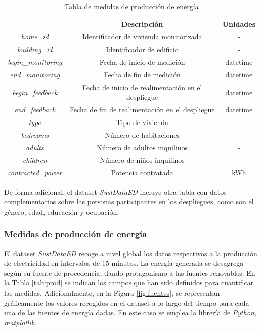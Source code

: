\vspace{3mm}

\begin{table}[h!]
    \centering
    \begin{tabular}{|c|c|c|}
    \hline
    \rowcolor[HTML]{AAAAAA} 
    \multicolumn{1}{|c|}{\cellcolor[HTML]{AAAAAA}Campo} & \multicolumn{1}{c|}{\cellcolor[HTML]{AAAAAA}Descripción} & Unidades \\ \hline
    \textit{home\_id} & Identificador de vivienda monitorizada & - \\ \hline
    \textit{building\_id} & Identificador de edificio & - \\ \hline
    \textit{begin\_monitoring} & Fecha de inicio de medición & datetime \\ \hline
    \textit{end\_monitoring} & Fecha de fin de medición & datetime \\ \hline
    \textit{begin\_feedback} & Fecha de inicio de realimentación en el despliegue & datetime \\ \hline
    \textit{end\_feedback} & Fecha de fin de realimentación en el despliegue & datetime \\ \hline
    \textit{type} & Tipo de vivienda & - \\ \hline
    \textit{bedrooms} & Número de habitaciones & - \\ \hline
    \textit{adults} & Número de adultos inquilinos & - \\ \hline
    \textit{children} & Número de niños inquilinos & - \\ \hline
    \textit{contracted\_power} & Potencia contratada & kWh \\ \hline
    \end{tabular}
    \caption{Tabla de medidas de producción de energía \cite{sustdata}}
    \label{tab:demo}
\end{table}

De forma adicional, el dataset \textit{SustDataED} incluye otra tabla con datos complementarios sobre las personas participantes en los despliegues, como son el género, edad, educación y ocupación.

\subsubsection{Medidas de producción de energía}
\label{sec:prodsustdata}

El dataset \textit{SustDataED} recoge a nivel global los datos respectivos a la producción de electricidad en intervalos de 15 minutos. La energía generada se desagrega según su fuente de procedencia, dando protagonismo a las fuentes renovables. En la Tabla \ref{tab:prod} se indican los campos que han sido definidos para cuantificar las medidas. Adicionalmente, en la Figura \ref{fig:fuentes}, se representan gráficamente los valores recogidos en el dataset a lo largo del tiempo para cada una de las fuentes de energía dadas. En este caso se emplea la librería de \textit{Python}, \textit{matplotlib}.

